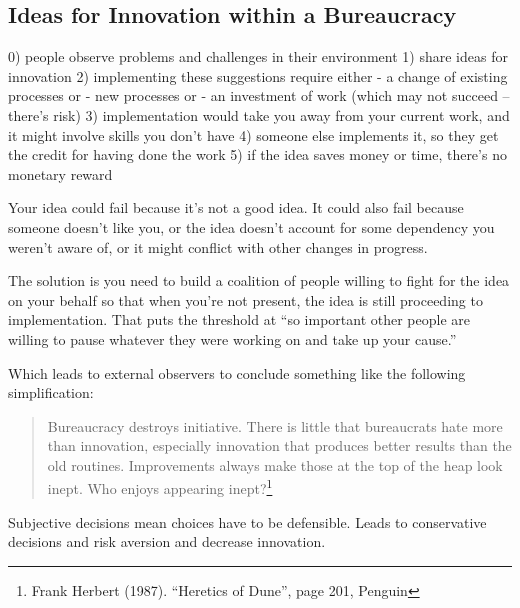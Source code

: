 \subsection{Ideas for Innovation within a Bureaucracy\label{sec:innovation}}


0) people observe problems and challenges in their environment
1) share ideas for innovation
2) implementing these suggestions require either 
    - a change of existing processes or 
    - new processes or 
    - an investment of work (which may not succeed -- there's risk)
3) implementation would take you away from your current work, and it might involve skills you don't have
4) someone else implements it, so they get the credit for having done the work
5) if the idea saves money or time, there's no monetary reward



Your idea could fail because it's not a good idea. It could also fail because someone doesn't like you, or the idea doesn't account for some dependency you weren't aware of, or it might conflict with other changes in progress.

The solution is you need to build a coalition of people willing to fight for the idea on your behalf so that when you're not present, the idea is still proceeding to implementation. 
That puts the threshold at ``so important other people are willing to pause whatever they were working on and take up your cause.''

Which leads to external observers to conclude something like the following simplification:
\begin{quote}
Bureaucracy destroys initiative. There is little that bureaucrats hate more than innovation, especially innovation that produces better results than the old routines.
Improvements always make those at the top of the heap look inept. Who enjoys appearing inept?\footnote{Frank Herbert (1987). ``Heretics of Dune'', page 201, Penguin}
\end{quote}


Subjective decisions mean choices have to be defensible. 
Leads to conservative decisions and risk aversion and decrease innovation. 
